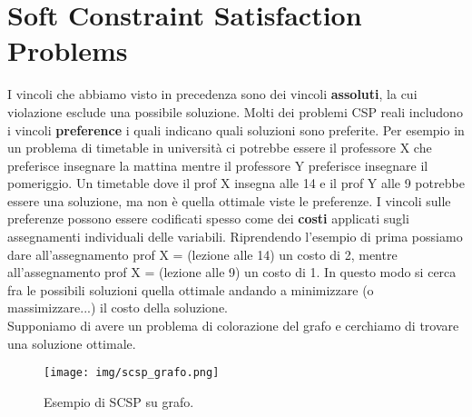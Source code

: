 \section{Soft Constraint Satisfaction Problems}
I vincoli che abbiamo visto in precedenza sono dei vincoli \textbf{assoluti}, la cui violazione esclude una possibile soluzione. Molti dei problemi CSP reali includono i vincoli \textbf{preference} i quali indicano quali soluzioni sono preferite. Per esempio in un problema di timetable in università ci potrebbe essere il professore X che preferisce insegnare la mattina mentre il professore Y preferisce insegnare il pomeriggio. Un timetable dove il prof X insegna alle 14 e il prof Y alle 9 potrebbe essere una soluzione, ma non è quella ottimale viste le preferenze. I vincoli sulle preferenze possono essere codificati spesso come dei \textbf{costi} applicati sugli assegnamenti individuali delle variabili. Riprendendo l'esempio di prima possiamo dare all'assegnamento prof X = (lezione alle 14) un costo di 2, mentre all'assegnamento prof X = (lezione alle 9) un costo di 1. In questo modo si cerca fra le possibili soluzioni quella ottimale andando a minimizzare (o massimizzare...) il costo della soluzione. \\
Supponiamo di avere un problema di colorazione del grafo e cerchiamo di trovare una soluzione ottimale. 
\begin{figure}[H]
    \centering
    \texttt{[image: img/scsp\_grafo.png]}
    \caption{Esempio di SCSP su grafo.}\label{fig:scps_grafo}
\end{figure}


